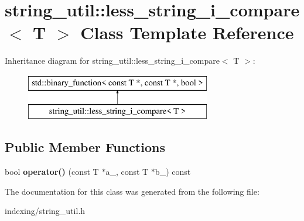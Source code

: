\hypertarget{classstring__util_1_1less__string__i__compare}{\section{string\-\_\-util\-:\-:less\-\_\-string\-\_\-i\-\_\-compare$<$ T $>$ Class Template Reference}
\label{classstring__util_1_1less__string__i__compare}
}
Inheritance diagram for string\-\_\-util\-:\-:less\-\_\-string\-\_\-i\-\_\-compare$<$ T $>$\-:\begin{figure}[H]
\begin{center}
\leavevmode
\includegraphics[height=2.000000cm]{classstring__util_1_1less__string__i__compare}
\end{center}
\end{figure}
\subsection*{Public Member Functions}
\begin{DoxyCompactItemize}
\item 
\hypertarget{classstring__util_1_1less__string__i__compare_ae2dd6a625b07bc51060805b30e7547a1}{bool {\bfseries operator()} (const T $\ast$a\-\_\-, const T $\ast$b\-\_\-) const }\label{classstring__util_1_1less__string__i__compare_ae2dd6a625b07bc51060805b30e7547a1}

\end{DoxyCompactItemize}


The documentation for this class was generated from the following file\-:\begin{DoxyCompactItemize}
\item 
indexing/string\-\_\-util.\-h\end{DoxyCompactItemize}
